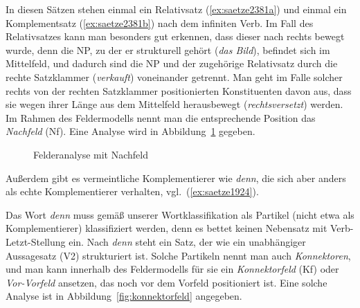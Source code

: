 
In diesen Sätzen stehen einmal ein Relativsatz (\ref{ex:saetze2381a}) und einmal ein Komplementsatz (\ref{ex:saetze2381b}) nach dem infiniten Verb.
Im Fall des Relativsatzes kann man besonders gut erkennen, dass dieser nach rechts bewegt wurde, denn die NP, zu der er strukturell gehört (\textit{das Bild}), befindet sich im Mittelfeld, und dadurch sind die NP und der zugehörige Relativsatz durch die rechte Satzklammer (\textit{verkauft}) voneinander getrennt.
Man geht im Falle solcher rechts von der rechten Satzklammer positionierten Konstituenten davon aus, dass sie wegen ihrer Länge aus dem Mittelfeld herausbewegt (\textit{rechtsversetzt}) werden.
Im Rahmen des Feldermodells nennt man die entsprechende Position das \textit{Nachfeld} (Nf).
Eine Analyse wird in Abbildung~\ref{fig:nachfeld} gegeben.


\begin{figure}
  \centering
  \caption{Felderanalyse mit Nachfeld}
  \label{fig:nachfeld}
\end{figure}

Außerdem gibt es vermeintliche Komplementierer wie \textit{denn}, die sich aber anders als echte Komplementierer verhalten, vgl.\ (\ref{ex:saetze1924}).

\begin{exe}
  \ex\label{ex:saetze1924}
  \begin{xlist}
  \end{xlist}
\end{exe}


Das Wort \textit{denn} muss gemäß unserer Wortklassifikation als Partikel (nicht etwa als Komplementierer) klassifiziert werden, denn es bettet keinen Nebensatz mit Verb-Letzt-Stellung ein.
Nach \textit{denn} steht ein Satz, der wie ein unabhängiger Aussagesatz (V2) strukturiert ist.
Solche Partikeln nennt man auch \textit{Konnektoren}, und man kann innerhalb des Feldermodells für sie ein \textit{Konnektorfeld} (Kf) oder \textit{Vor-Vorfeld} ansetzen, das noch vor dem Vorfeld positioniert ist.
Eine solche Analyse ist in Abbildung~\ref{fig:konnektorfeld} angegeben.

